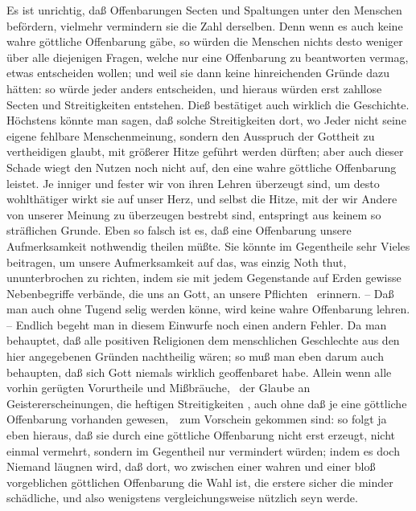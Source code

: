 \begin{aufza}\setcounter{enumi}{1}
\item Es ist unrichtig, daß Offenbarungen Secten und Spaltungen unter den Menschen befördern, vielmehr vermindern sie die Zahl derselben. Denn wenn es auch keine wahre göttliche Offenbarung gäbe, so würden die Menschen nichts desto weniger über alle diejenigen Fragen, welche nur eine Offenbarung zu beantworten vermag, etwas entscheiden wollen; und weil sie dann keine hinreichenden Gründe dazu hätten: so würde jeder anders entscheiden, und hieraus würden erst zahllose Secten und Streitigkeiten entstehen. Dieß bestätiget auch wirklich die Geschichte. Höchstens könnte man sagen, daß solche Streitigkeiten dort, wo Jeder nicht seine eigene fehlbare Menschenmeinung, sondern den Ausspruch der Gottheit zu vertheidigen glaubt, mit größerer Hitze geführt werden dürften; aber auch dieser Schade wiegt den Nutzen noch nicht auf, den eine wahre göttliche Offenbarung leistet. Je inniger und fester wir von ihren Lehren überzeugt sind, um desto wohlthätiger wirkt sie auf unser Herz, und selbst die Hitze, mit der wir Andere von unserer Meinung zu überzeugen bestrebt sind, entspringt aus keinem so sträflichen Grunde. Eben so falsch ist es, daß eine Offenbarung unsere Aufmerksamkeit nothwendig theilen müßte. Sie könnte im Gegentheile sehr Vieles beitragen, um unsere Aufmerksamkeit auf das, was einzig Noth thut, ununterbrochen zu richten, indem sie mit jedem Gegenstande auf Erden gewisse Nebenbegriffe verbände, die uns an Gott, an unsere Pflichten \usw\ erinnern. -- Daß man auch ohne Tugend selig werden könne, wird keine wahre Offenbarung lehren. -- Endlich begeht man in diesem Einwurfe noch einen andern Fehler. Da man behauptet, daß alle positiven Religionen dem menschlichen Geschlechte aus den hier angegebenen Gründen nachtheilig wären; so muß man eben darum auch behaupten, daß sich Gott niemals wirklich geoffenbaret habe. Allein wenn alle vorhin gerügten Vorurtheile und Mißbräuche, \zB\ der Glaube an Geistererscheinungen, die heftigen Streitigkeiten \usw , auch ohne daß je eine göttliche Offenbarung vorhanden gewesen,~\ zum Vorschein gekommen sind: so folgt ja eben hieraus, daß sie durch eine göttliche Offenbarung nicht erst erzeugt, nicht einmal vermehrt, sondern im Gegentheil nur vermindert würden; indem es doch Niemand läugnen wird, daß dort, wo zwischen einer wahren und einer bloß vorgeblichen göttlichen Offenbarung die Wahl ist, die erstere sicher die minder schädliche, und also wenigstens vergleichungsweise nützlich seyn werde.
\end{aufza}

